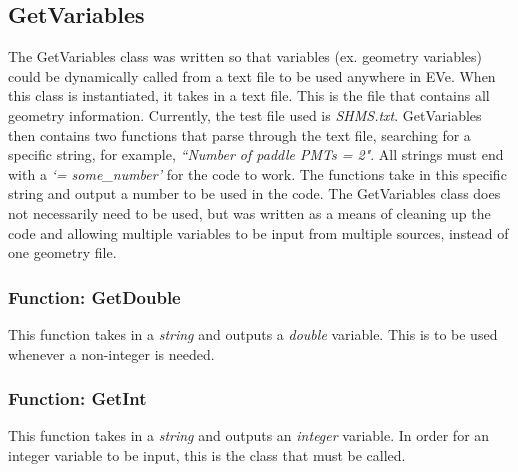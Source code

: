 \documentclass[12pt]{article}
\numberwithin{equation}{section}
\begin{document}
\subsection{GetVariables}
The GetVariables class was written so that variables (ex. geometry variables) could be dynamically called from a text file to be used anywhere in EVe. When this class is instantiated, it takes in a text file. This is the file that contains all geometry information. Currently, the test file used is \textit{SHMS.txt}. GetVariables then contains two functions that parse through the text file, searching for a specific string, for example, \textit{``Number of paddle PMTs = 2"}. All strings must end with a \textit{`= some\_number'} for the code to work. The functions take in this specific string and output a number to be used in the code. The GetVariables class does not necessarily need to be used, but was written as a means of cleaning up the code and allowing multiple variables to be input from multiple sources, instead of one geometry file.

\subsubsection{Function: GetDouble}
This function takes in a \textit{string} and outputs a \textit{double} variable. This is to be used whenever a non-integer is needed.

\subsubsection{Function: GetInt}
This function takes in a \textit{string} and outputs an \textit{integer} variable. In order for an integer variable to be input, this is the class that must be called. 
\end{document}
